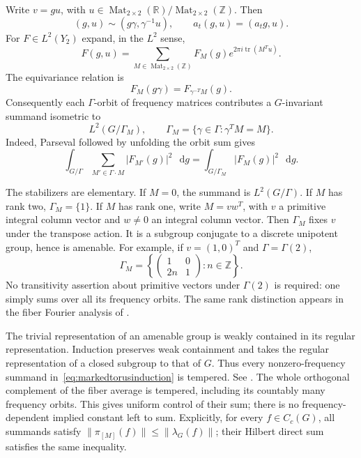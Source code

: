 \documentclass[11pt,a4paper]{article}
\numberwithin{equation}{section}
\theoremstyle{definition}
\theoremstyle{remark}
\DeclareMathOperator{\tr}{tr}
\newcommand{\dd}{\mathop{}\!\mathrm d}
\newcommand{\RR}{\mathbb R}
\newcommand{\ZZ}{\mathbb Z}
\begin{document}
Write $v=gu$, with $u\in\operatorname{Mat}_{2\times2}(\RR)/
\operatorname{Mat}_{2\times2}(\ZZ)$. Then
\[
 (g,u)\sim(g\gamma,\gamma^{-1}u),\qquad
 a_t(g,u)=(a_tg,u).
\]
For $F\in L^2(Y_2)$ expand, in the $L^2$ sense,
\begin{equation}
 F(g,u)=\sum_{M\in\operatorname{Mat}_{2\times2}(\ZZ)}
   F_M(g)e^{2\pi i\tr(M^Tu)}.
 \label{eq:markedtorusfourier}
\end{equation}
The equivariance relation is
\begin{equation}
 F_M(g\gamma)=F_{\gamma^{-T}M}(g).
 \label{eq:markedtorusequivariance}
\end{equation}
Consequently each $\Gamma$-orbit of frequency matrices contributes
a $G$-invariant summand isometric to
\begin{equation}
 L^2(G/\Gamma_M),\qquad
 \Gamma_M=\{\gamma\in\Gamma:\gamma^TM=M\}.
 \label{eq:markedtorusinduction}
\end{equation}
Indeed, Parseval followed by unfolding the orbit sum gives
\[
 \int_{G/\Gamma}
       \sum_{M'\in\Gamma\cdot M}|F_{M'}(g)|^2\,\dd g
   =\int_{G/\Gamma_M}|F_M(g)|^2\,\dd g.
\]

The stabilizers are elementary. If $M=0$, the summand is
$L^2(G/\Gamma)$. If $M$ has rank two, $\Gamma_M=\{1\}$.
If $M$ has rank one, write $M=vw^T$, with $v$ a primitive
integral column vector and $w\ne0$ an integral column vector.
Then $\Gamma_M$ fixes $v$ under the transpose action. It is a
subgroup conjugate to a discrete unipotent group, hence is
amenable. For example, if $v=(1,0)^T$ and $\Gamma=\Gamma(2)$,
\[
 \Gamma_M=
 \left\{\begin{pmatrix}1&0\\2n&1\end{pmatrix}:n\in\ZZ\right\}.
\]
No transitivity assertion about primitive vectors under $\Gamma(2)$
is required: one simply sums over all its frequency orbits. The same
rank distinction appears in the fiber Fourier analysis of
\cite[Section~4, especially Lemma~4.3]{StrombergssonVishe}.

The trivial representation of an amenable group is weakly
contained in its regular representation. Induction preserves
weak containment and takes the regular representation of a closed
subgroup to that of $G$. Thus every nonzero-frequency summand
in~\eqref{eq:markedtorusinduction} is tempered. See
\cite[Lemma 2.3 and Remark 2.4]{BenoistKobayashi}.
The whole orthogonal complement of the fiber average is tempered,
including its countably many frequency orbits. This gives uniform
control of their sum; there is no frequency-dependent implied
constant left to sum. Explicitly, for every $f\in C_c(G)$, all
summands satisfy $\|\pi_{[M]}(f)\|\leq\|\lambda_G(f)\|$;
their Hilbert direct sum satisfies the same inequality.
\end{document}
